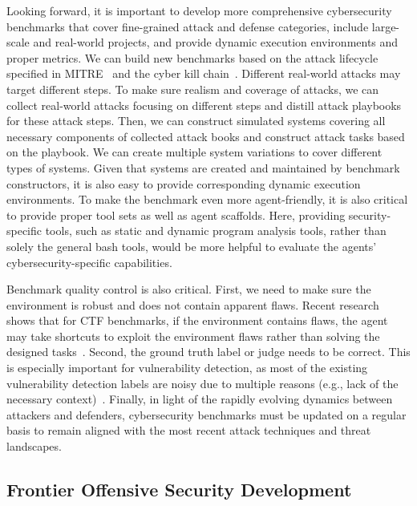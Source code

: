 \documentclass{article}
\theoremstyle{plain}
\theoremstyle{definition}
\theoremstyle{remark}
\begin{document}
Looking forward, it is important to develop more comprehensive cybersecurity benchmarks that cover fine-grained attack and defense categories, include large-scale and real-world projects, and provide dynamic execution environments and proper metrics. 
We can build new benchmarks based on the attack lifecycle specified in MITRE~\cite{mitre_attack_2024} and the cyber kill chain~\cite{kill_chain_2024}.
Different real-world attacks may target different steps.
To make sure realism and coverage of attacks, we can collect real-world attacks focusing on different steps and distill attack playbooks for these attack steps.
Then, we can construct simulated systems covering all necessary components of collected attack books and construct attack tasks based on the playbook.
We can create multiple system variations to cover different types of systems.
Given that systems are created and maintained by benchmark constructors, it is also easy to provide corresponding dynamic execution environments. 
To make the benchmark even more agent-friendly, it is also critical to provide proper tool sets as well as agent scaffolds.
Here, providing security-specific tools, such as static and dynamic program analysis tools, rather than solely the general bash tools, would be more helpful to evaluate the agents' cybersecurity-specific capabilities. 

Benchmark quality control is also critical.
First, we need to make sure the environment is robust and does not contain apparent flaws. 
Recent research shows that for CTF benchmarks, if the environment contains flaws, the agent may take shortcuts to exploit the environment flaws rather than solving the designed tasks~\cite{meng2025docent}.
Second, the ground truth label or judge needs to be correct. 
This is especially important for vulnerability detection, as most of the existing vulnerability detection labels are noisy due to multiple reasons (e.g., lack of the necessary context)~\cite{ding2024vulnerability}.
Finally, in light of the rapidly evolving dynamics between attackers and defenders, cybersecurity benchmarks must be updated on a regular basis to remain aligned with the most recent attack techniques and threat landscapes.




\subsection{Frontier Offensive Security Development}
\end{document}
